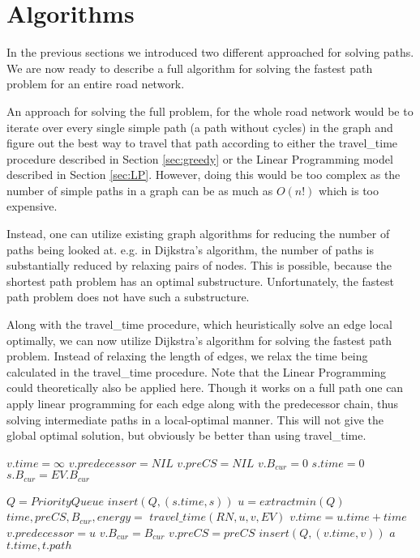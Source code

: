 \section{Algorithms}\label{sec:algo}
In the previous sections we introduced two different approached for solving paths. We are now ready to describe a full algorithm for solving the fastest path problem for an entire road network. 

An approach for solving the full problem, for the whole road network would be to iterate over every single simple path (a path without cycles) in the graph and figure out the best way to travel that path according to either the travel\_time procedure described in Section \ref{sec:greedy} or the Linear Programming model described in Section \ref{sec:LP}. However, doing this would be too complex as the number of simple paths in a graph can be as much as $O(n!)$ which is too expensive.

Instead, one can utilize existing graph algorithms for reducing the number of paths being looked at. e.g. in Dijkstra's algorithm, the number of paths is substantially reduced by relaxing pairs of nodes. This is possible, because the shortest path problem has an optimal substructure. Unfortunately, the fastest path problem does not have such a substructure.

Along with the travel\_time procedure, which heuristically solve an edge local optimally, we can now utilize Dijkstra's algorithm for solving the fastest path problem. Instead of relaxing the length of edges, we relax the time being calculated in the travel\_time procedure. Note that the Linear Programming could theoretically also be applied here. Though it works on a full path one can apply linear programming for each edge along with the predecessor chain, thus solving intermediate paths in a local-optimal manner. This will not give the global optimal solution, but obviously be better than using travel\_time.
\begin{algorithmic}[1]
        \State $v.time = \infty$
        \State $v.predecessor = NIL$
        \State $v.preCS = NIL$
        \State $v.B_{cur} = 0$
    \EndFor
    \State $s.time = 0$
    \State $s.B_{cur} = EV.B_{cur}$

    \State $Q = PriorityQueue$
    \State $insert(Q, (s.time, s))$ 
        \State $u = extractmin(Q)$
            \State $time,preCS,B_{cur},energy = $
            \State $travel\_time(RN, u, v, EV)$
                \State $v.time = u.time + time$
                \State $v.predecessor = u$
                \State $v.B_{cur} = B_{cur}$
                \State $v.preCS = preCS$
                \State $insert(Q, (v.time, v))$ 
            \EndIf
                \State $a$
            \EndIf
        \EndFor
    \EndWhile
    \State \Return $t.time, t.path$
\EndFunction
\end{algorithmic}\label{alg:fastest_path}



